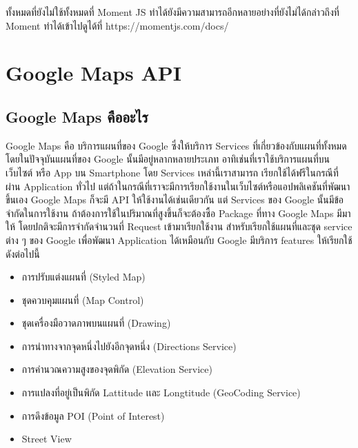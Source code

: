 \begin{enumerate}
	ทั้งหมดที่ยังไม่ใช้ทั้งหมดที่ Moment JS ทำได้ยังมีความสามารถอีกหลายอย่างที่ยังไม่ได้กล่าวถึงที่ Moment ทำได้เข้าไปดูได้ที่ https://momentjs.com/docs/

	\section{Google Maps API}
		\subsection{Google Maps คืออะไร}
		Google Maps คือ บริการแผนที่ของ Google ซึ่งให้บริการ Services ที่เกี่ยวข้องกับแผนที่ทั้งหมด โดยในปัจจุบันแผนที่ของ Google
		นั้นมีอยู่หลากหลายประเภท อาทิเช่นที่เราใช้บริการแผนที่บนเว็บไซต์ หรือ App บน Smartphone โดย Services เหล่านี้เราสามารถ
		เรียกใช้ได้ฟรีในกรณีที่ผ่าน Application ทั่วไป แต่ถ้าในกรณีที่เราจะมีการเรียกใช้งานในเว็บไซต์หรือแอปพลิเคชันที่พัฒนาขึ้นเอง Google Maps 
		ก็จะมี API ให้ใช้งานได้เช่นเดียวกัน แต่ Services ของ Google นั้นมีข้อจำกัดในการใช้งาน ถ้าต้องการใช้ในปริมาณที่สูงขึ้นก็จะต้องซื้อ Package 
		ที่ทาง Google Maps มีมาให้ โดยปกติจะมีการจำกัดจำนวนที่ Request เข้ามาเรียกใช้งาน สำหรับเรียกใช้แผนที่และชุด service ต่าง ๆ ของ Google 
		เพื่อพัฒนา Application ได้เหมือนกับ Google มีบริการ features ให้เรียกใช้ดังต่อไปนี้
		\begin{itemize}
			\item การปรับแต่งแผนที่ (Styled Map)
			\item ชุดควบคุมแผนที่ (Map Control)
			\item ชุดเครื่องมือวาดภาพบนแผนที่ (Drawing)
			\item การนำทางจากจุดหนึ่งไปยังอีกจุดหนึ่ง (Directions Service)
			\item การคำนวณความสูงของจุดพิกัด (Elevation Service)
			\item การแปลงที่อยู่เป็นพิกัด Lattitude เเละ Longtitude (GeoCoding Service)
			\item การดึงข้อมูล POI (Point of Interest)
			\item Street View
		\end{itemize}


\end{enumerate}
